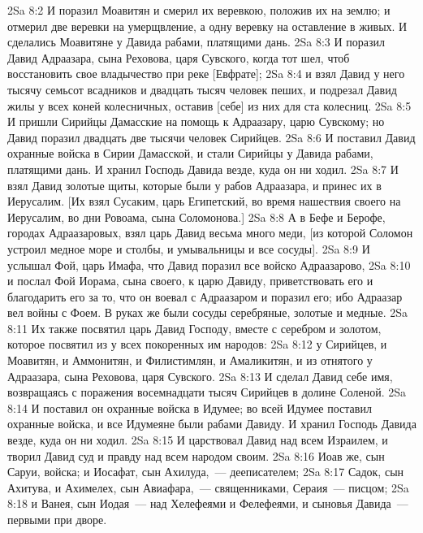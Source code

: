 \vs 2Sa 8:2 И поразил Моавитян и смерил их веревкою, положив их на землю; и отмерил две веревки на умерщвление, а одну веревку на оставление в живых. И сделались Моавитяне у Давида рабами, платящими дань.
\vs 2Sa 8:3 И поразил Давид Адраазара, сына Реховова, царя Сувского, когда тот шел, чтоб восстановить свое владычество при реке [Евфрате];
\vs 2Sa 8:4 и взял Давид у него тысячу семьсот всадников и двадцать тысяч человек пеших, и подрезал Давид жилы у всех коней колесничных, оставив [себе] из них для ста колесниц.
\vs 2Sa 8:5 И пришли Сирийцы Дамасские на помощь к Адраазару, царю Сувскому; но Давид поразил двадцать две тысячи человек Сирийцев.
\vs 2Sa 8:6 И поставил Давид охранные войска в Сирии Дамасской, и стали Сирийцы у Давида рабами, платящими дань. И хранил Господь Давида везде, куда он ни ходил.
\vs 2Sa 8:7 И взял Давид золотые щиты, которые были у рабов Адраазара, и принес их в Иерусалим. [Их взял  Сусаким, царь Египетский, во время нашествия своего на Иерусалим, во дни Ровоама, сына Соломонова.]
\vs 2Sa 8:8 А в Бефе и Берофе, городах Адраазаровых, взял царь Давид весьма много меди, [из которой Соломон устроил медное море и столбы, и умывальницы и все сосуды].
\vs 2Sa 8:9 И услышал Фой, царь Имафа, что Давид поразил все войско Адраазарово,
\vs 2Sa 8:10 и послал Фой Иорама, сына своего, к царю Давиду, приветствовать его и благодарить его за то, что он воевал с Адраазаром и поразил его; ибо Адраазар вел войны с Фоем. В руках же  были сосуды серебряные, золотые и медные.
\vs 2Sa 8:11 Их также посвятил царь Давид Господу, вместе с серебром и золотом, которое посвятил из  у всех покоренных им народов:
\vs 2Sa 8:12 у Сирийцев, и Моавитян, и Аммонитян, и Филистимлян, и Амаликитян, и из отнятого у Адраазара, сына Реховова, царя Сувского.
\vs 2Sa 8:13 И сделал Давид себе имя, возвращаясь с поражения восемнадцати тысяч Сирийцев в долине Соленой.
\vs 2Sa 8:14 И поставил он охранные войска в Идумее; во всей Идумее поставил охранные войска, и все Идумеяне были рабами Давиду. И хранил Господь Давида везде, куда он ни ходил.
\vs 2Sa 8:15 И царствовал Давид над всем Израилем, и творил Давид суд и правду над всем народом своим.
\vs 2Sa 8:16 Иоав же, сын Саруи,  войска; и Иосафат, сын Ахилуда,~--- дееписателем;
\vs 2Sa 8:17 Садок, сын Ахитува, и Ахимелех, сын Авиафара,~--- священниками, Сераия~--- писцом;
\vs 2Sa 8:18 и Ванея, сын Иодая~---  над Хелефеями и Фелефеями, и сыновья Давида~--- первыми при дворе.
